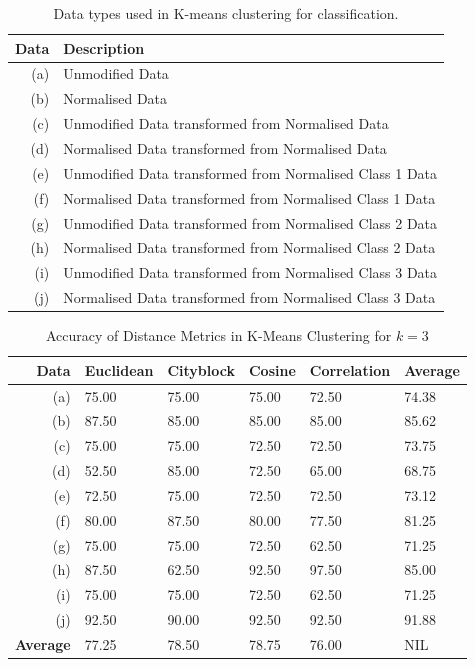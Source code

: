 \documentclass[a4paper, 10pt, conference]{ieeeconf}
\begin{document}
\begin{table}[!ht]
\centering
\caption{Data types used in K-means clustering for classification.}
\label{tbl:types}
\begin{tabular}{|r|l|}
\hline
\textbf{Data} & \textbf{Description} \\ \hline
(a) & Unmodified Data\\
(b) & Normalised Data\\
(c) & Unmodified Data transformed from Normalised Data\\
(d) & Normalised Data transformed from Normalised Data\\
(e) & Unmodified Data transformed from Normalised Class 1 Data\\
(f) & Normalised Data transformed from Normalised Class 1 Data\\
(g) & Unmodified Data transformed from Normalised Class 2 Data\\
(h) & Normalised Data transformed from Normalised Class 2 Data\\
(i) & Unmodified Data transformed from Normalised Class 3 Data\\
(j) & Normalised Data transformed from Normalised Class 3 Data\\\hline
\end{tabular}
\end{table}

\begin{table}[!ht]
\centering
\caption{Accuracy of Distance Metrics in K-Means Clustering for $k = 3$}
\label{tbl:k3}
\begin{tabular}{|r|lllll|}
\hline
\textbf{Data} & \textbf{Euclidean} & \textbf{Cityblock} & \textbf{Cosine} & \textbf{Correlation} & \textbf{Average} \\ \hline
(a) & 75.00 & 75.00 & 75.00 & 72.50 & 74.38\\
(b) & 87.50 & 85.00 & 85.00 & 85.00 & 85.62\\
(c) & 75.00 & 75.00 & 72.50 & 72.50 & 73.75\\
(d) & 52.50 & 85.00 & 72.50 & 65.00 & 68.75\\
(e) & 72.50 & 75.00 & 72.50 & 72.50 & 73.12\\
(f) & 80.00 & 87.50 & 80.00 & 77.50 & 81.25\\
(g) & 75.00 & 75.00 & 72.50 & 62.50 & 71.25\\
(h) & 87.50 & 62.50 & 92.50 & 97.50 & 85.00\\
(i) & 75.00 & 75.00 & 72.50 & 62.50 & 71.25\\
(j) & 92.50 & 90.00 & 92.50 & 92.50 & 91.88\\
\textbf{Average} & 77.25 & 78.50 & 78.75 & 76.00 & NIL \\ \hline
\end{tabular}
\end{table}
\end{document}
